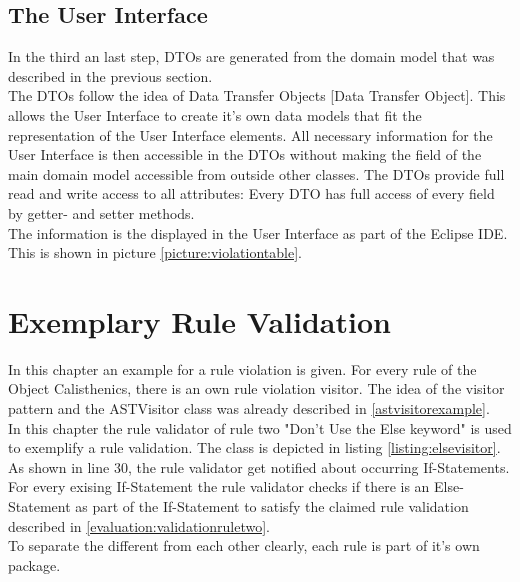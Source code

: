 \subsection{The User Interface}
In the third an last step, \acf{DTO}s are generated from the domain model that was described in the previous section. 
\\

The \acf{DTO}s follow the idea of Data Transfer Objects \cite{wiki}[Data Transfer Object]. This allows the User Interface to create it's own data models that fit the representation of the User Interface elements. All necessary information for the User Interface is then accessible in the \acf{DTO}s without making the field of the main domain model accessible from outside other classes. The \acf{DTO}s provide full read and write access to all attributes: Every \acf{DTO} has full access of every field by getter- and setter methods. 
\\

The information is the displayed in the User Interface as part of the Eclipse \acf{IDE}. This is shown in picture \ref{picture:violationtable}.


\section{Exemplary Rule Validation}
\label{p:example}
In this chapter an example for a rule violation is given. For every rule of the Object Calisthenics, there is an own rule violation visitor. The idea of the visitor pattern and the \acf{ASTVisitor} class was already described in \ref{astvisitorexample}. 
\\

In this chapter the rule validator of rule two "Don't Use the Else keyword" is used to exemplify a rule validation. The class is depicted in listing \ref{listing:elsevisitor}.
\\

As shown in line 30, the rule validator get notified about occurring If-Statements. For every exising If-Statement the rule validator checks if there is an Else-Statement as part of the If-Statement to satisfy the claimed rule validation described in \ref{evaluation:validationruletwo}. 
\\

To separate the different from each other clearly, each rule is part of it's own package. 

